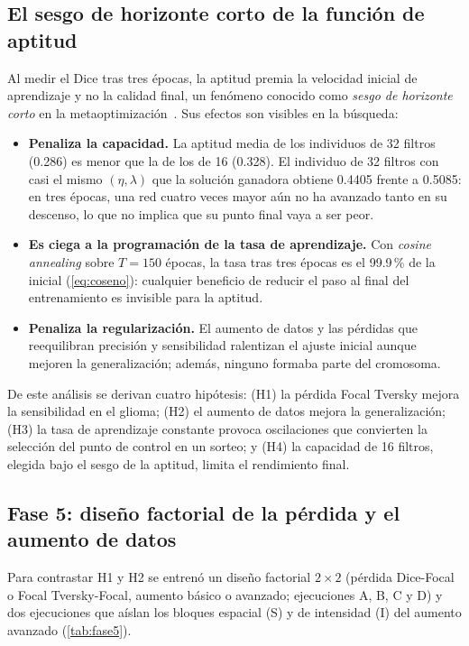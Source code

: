 \subsection{El sesgo de horizonte corto de la función de aptitud}\label{subsec:sesgo}

Al medir el Dice tras tres épocas, la aptitud premia la velocidad inicial de aprendizaje y no la calidad final, un fenómeno conocido como \emph{sesgo de horizonte corto} en la metaoptimización~\cite{wu2018shorthorizon}. Sus efectos son visibles en la búsqueda:

\begin{itemize}
  \item \textbf{Penaliza la capacidad.} La aptitud media de los individuos de 32 filtros (0.286) es menor que la de los de 16 (0.328). El individuo de 32 filtros con casi el mismo $(\eta,\lambda)$ que la solución ganadora obtiene 0.4405 frente a 0.5085: en tres épocas, una red cuatro veces mayor aún no ha avanzado tanto en su descenso, lo que no implica que su punto final vaya a ser peor.
  \item \textbf{Es ciega a la programación de la tasa de aprendizaje.} Con \textit{cosine annealing} sobre $T=150$ épocas, la tasa tras tres épocas es el 99.9\,\% de la inicial (\cref{eq:coseno}): cualquier beneficio de reducir el paso al final del entrenamiento es invisible para la aptitud.
  \item \textbf{Penaliza la regularización.} El aumento de datos y las pérdidas que reequilibran precisión y sensibilidad ralentizan el ajuste inicial aunque mejoren la generalización; además, ninguno formaba parte del cromosoma.
\end{itemize}

De este análisis se derivan cuatro hipótesis: (H1) la pérdida Focal Tversky mejora la sensibilidad en el glioma; (H2) el aumento de datos mejora la generalización; (H3) la tasa de aprendizaje constante provoca oscilaciones que convierten la selección del punto de control en un sorteo; y (H4) la capacidad de 16 filtros, elegida bajo el sesgo de la aptitud, limita el rendimiento final.

\subsection{Fase 5: diseño factorial de la pérdida y el aumento de datos}\label{subsec:fase5}

Para contrastar H1 y H2 se entrenó un diseño factorial $2\times2$ (pérdida Dice-Focal o Focal Tversky-Focal, aumento básico o avanzado; ejecuciones A, B, C y D) y dos ejecuciones que aíslan los bloques espacial (S) y de intensidad (I) del aumento avanzado (\cref{tab:fase5}).

